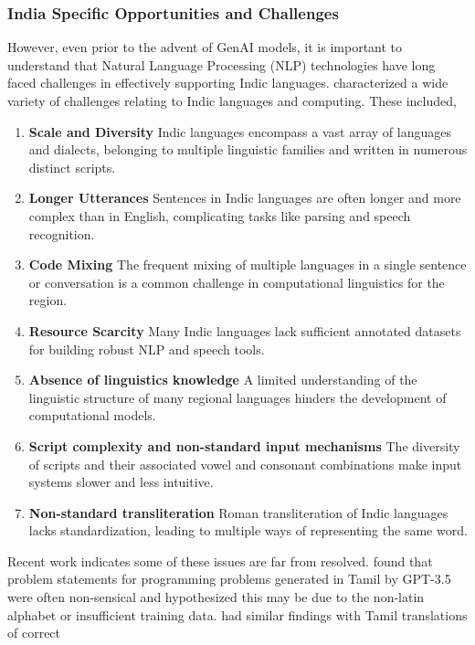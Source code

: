 \subsubsection{India Specific Opportunities and Challenges}



However, even prior to the advent of GenAI models, it is important to understand
that Natural Language Processing (NLP) technologies have long faced challenges
in effectively supporting Indic languages. \citet{bhattacharyya2019indic}
characterized a wide variety of challenges relating to Indic languages and
computing. These included, 
\begin{enumerate} 
  \item \textbf{Scale and Diversity}
  Indic languages encompass a vast array of languages and dialects, belonging to multiple linguistic families and written in numerous distinct scripts.
  \item \textbf{Longer Utterances}
    Sentences in Indic languages are often longer and more complex than in English, complicating tasks like parsing and speech recognition.
  \item \textbf{Code Mixing}
    The frequent mixing of multiple languages in a single sentence or conversation is a common challenge in computational linguistics for the region.
  \item \textbf{Resource Scarcity}
    Many Indic languages lack sufficient annotated datasets for building robust NLP and speech tools.
  \item \textbf{Absence of linguistics knowledge}
    A limited understanding of the linguistic structure of many regional languages hinders the development of computational models.
  \item \textbf{Script complexity and non-standard input mechanisms}
    The diversity of scripts and their associated vowel and consonant combinations make input systems slower and less intuitive.
  \item \textbf{Non-standard transliteration}
    Roman transliteration of Indic languages lacks standardization, leading to multiple ways of representing the same word.
\end{enumerate}
Recent work indicates some of these issues are far from resolved.
\citet{jordan2024need} found that problem statements for programming problems
generated in Tamil by GPT-3.5 were often non-sensical and hypothesized this may
be due to the non-latin alphabet or insufficient training data.
\citet{smith2024explain} had similar findings with Tamil translations of correct
